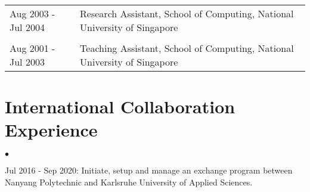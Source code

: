 \documentclass[margin,line]{res}
\newenvironment{list2}{
  \begin{list}{$\bullet$}{%
      \setlength{\itemsep}{0in}
      \setlength{\parsep}{0in} \setlength{\parskip}{0in}
      \setlength{\topsep}{0in} \setlength{\partopsep}{0in} 
      \setlength{\leftmargin}{0.2in}}}{\end{list}}
\newcommand{\longversion}[1]{}
\begin{document}
\begin{resume}
\begin{tabular}{ll}
 Aug 2003 - Jul 2004  & Research Assistant, School of Computing, National University of Singapore \\ \\
 Aug 2001 - Jul 2003 & Teaching Assistant,  School of Computing, National University of Singapore 
\end{tabular}

\section{\sc International Collaboration Experience}
\begin{list2} 
\item  Jul 2016 - Sep 2020: Initiate, setup and manage an exchange program between Nanyang
                       Polytechnic and Karlsruhe University of Applied Sciences.  
\end{list2}


\end{resume}
\end{document}

